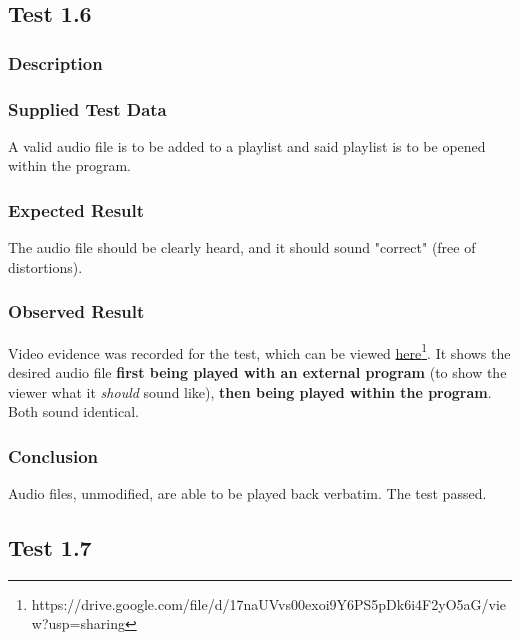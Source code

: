\pagebreak
\subsection{Test 1.6}
\subsubsection*{Description}
\paragraph{}
{
	\centering
}

\subsubsection*{Supplied Test Data}
A valid audio file is to be added to a playlist and said playlist is to be opened within the program.

\subsubsection*{Expected Result}
The audio file should be clearly heard, and it should sound "correct" (free of distortions).

\subsubsection*{Observed Result}
\label{sec:evidence1.6}
Video evidence was recorded for the test, which can be viewed \href{https://drive.google.com/file/d/17naUVvs00exoi9Y6PS5pDk6i4F2yO5aG/view?usp=sharing}{here}\footnote{
	https://drive.google.com/file/d/17naUVvs00exoi9Y6PS5pDk6i4F2yO5aG/view?usp=sharing
}. It shows the desired audio file \textbf{first being played with an external program} (to show the viewer what it \textit{should} sound like), \textbf{then being played within the program}. Both sound identical.

\subsubsection*{Conclusion}
Audio files, unmodified, are able to be played back verbatim. The test passed.


\pagebreak
\subsection{Test 1.7}
